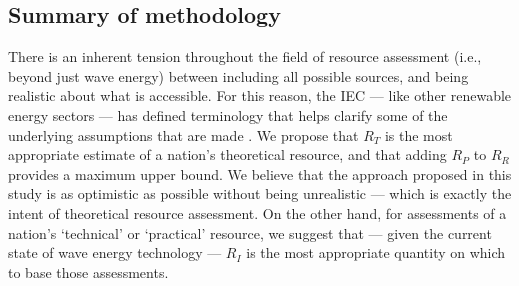\subsection{Summary of methodology}

There is an inherent tension throughout the field of resource assessment (i.e., beyond just wave energy) between including all possible sources, and being realistic about what is accessible. For this reason, the IEC — like other renewable energy sectors — has defined terminology that helps clarify some of the underlying assumptions that are made \citep[][]{internationalelectrotechnicalcommissionPartTerminologyEdition2020}. We propose that $R_T$ is the most appropriate estimate of a nation's theoretical resource, and that adding $R_P$ to $R_{R}$ provides a maximum upper bound. We believe that the approach proposed in this study is as optimistic as possible without being unrealistic — which is exactly the intent of theoretical resource assessment.  On the other hand, for assessments of a nation's `technical' or `practical' resource, we suggest that — given the current state of wave energy technology — $R_I$ is the most appropriate quantity on which to base those assessments.

